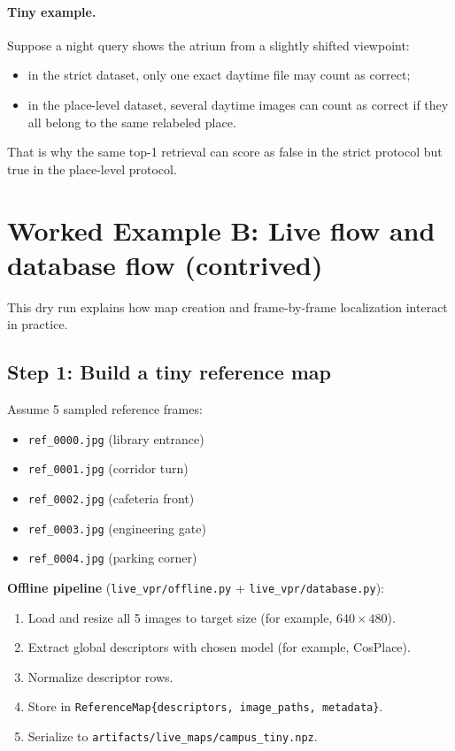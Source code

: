 \documentclass[11pt]{article}
\newcommand{\file}[1]{\texttt{#1}}
\begin{document}
\paragraph{Tiny example.}
Suppose a night query shows the atrium from a slightly shifted viewpoint:
\begin{itemize}[leftmargin=*]
  \item in the strict dataset, only one exact daytime file may count as correct;
  \item in the place-level dataset, several daytime images can count as correct if they all belong to the same relabeled place.
\end{itemize}

That is why the same top-1 retrieval can score as false in the strict protocol but true in the place-level protocol.

\section{Worked Example B: Live flow and database flow (contrived)}
This dry run explains how map creation and frame-by-frame localization interact in practice.

\subsection{Step 1: Build a tiny reference map}
Assume 5 sampled reference frames:
\begin{itemize}[leftmargin=*]
  \item \file{ref\_0000.jpg} (library entrance)
  \item \file{ref\_0001.jpg} (corridor turn)
  \item \file{ref\_0002.jpg} (cafeteria front)
  \item \file{ref\_0003.jpg} (engineering gate)
  \item \file{ref\_0004.jpg} (parking corner)
\end{itemize}

\textbf{Offline pipeline} (\file{live\_vpr/offline.py} + \file{live\_vpr/database.py}):
\begin{enumerate}[leftmargin=*]
  \item Load and resize all 5 images to target size (for example, $640\times480$).
  \item Extract global descriptors with chosen model (for example, CosPlace).
  \item Normalize descriptor rows.
  \item Store in \texttt{ReferenceMap\{descriptors, image\_paths, metadata\}}.
  \item Serialize to \file{artifacts/live\_maps/campus\_tiny.npz}.
\end{enumerate}
\end{document}
